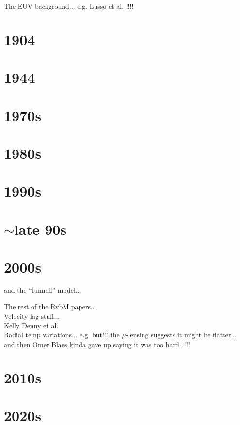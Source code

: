 \documentclass[11pt,a4paper]{article}
\begin{document}
The EUV background...
e.g. Lusso et al. !!!!


\section{1904}

\section{1944}

\section{1970s}

\section{1980s}

\section{1990s}


\section{$\sim$late 90s}

\section{2000s}
\citet[e.g.][]{Elvis00} and the ``funnell'' model...

\noindent
The rest of the RvbM papers..\\

\noindent
Velocity lag stuff...\\
Kelly Denny et al.\\

\noindent
Radial temp variations... 
e.g. \citet{SS73}
but!!!
the $\mu$-lensing suggests it might be flatter...
and then Omer Blaes kinda gave up saying it was too hard...!!!\\


\section{2010s}
\citet{Lawrence12} 


\section{2020s}
\end{document}
